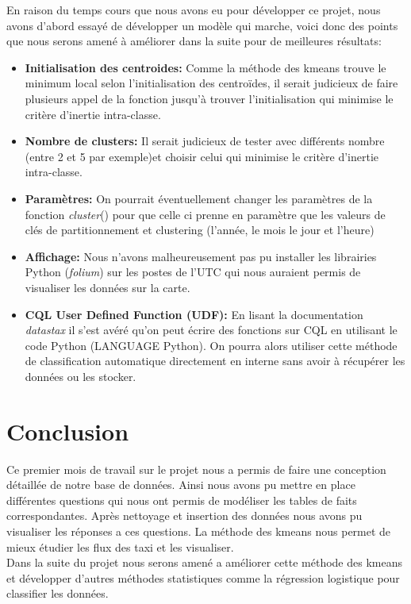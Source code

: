 \documentclass[]{report}
\begin{document}
	En raison du temps cours que  nous avons eu pour développer ce projet, nous avons d'abord essayé de développer un modèle qui marche, voici donc des points que nous  serons amené à  améliorer dans la suite pour de meilleures résultats:
	\begin{itemize}
		\item \textbf{Initialisation des centroides:} Comme la méthode des kmeans trouve le minimum local selon l'initialisation des centroïdes, il serait judicieux de faire plusieurs appel de la fonction jusqu'à trouver l'initialisation qui minimise le critère d'inertie intra-classe.
		\item \textbf{Nombre de clusters:}  Il serait judicieux de tester avec différents nombre (entre 2 et 5 par exemple)et choisir celui qui minimise le critère d'inertie intra-classe.
		\item \textbf{Paramètres:} On pourrait éventuellement changer les paramètres de la fonction \textit{cluster}() pour que celle ci prenne en paramètre que les valeurs de clés de partitionnement  et clustering (l'année, le mois le jour et l'heure)
		\item \textbf{Affichage:} Nous n'avons malheureusement pas pu installer les librairies Python (\textit{folium}) sur les postes de l'UTC qui nous auraient permis de visualiser les données sur la carte.
		\item \textbf{CQL User Defined Function (UDF):} En lisant la documentation \textit{datastax} il s'est avéré qu'on peut écrire des fonctions sur CQL en utilisant le code Python (LANGUAGE Python). On pourra alors utiliser cette méthode de classification automatique directement en interne sans avoir à récupérer les données ou les stocker.
	\end{itemize}
	
	\section{Conclusion}
	Ce premier mois de travail sur le projet nous a permis de faire une conception détaillée de notre base de données. Ainsi nous avons pu mettre en place différentes questions qui nous ont permis de modéliser les tables de faits correspondantes. Après nettoyage et insertion des données nous avons pu visualiser les réponses a ces questions. La méthode des kmeans nous permet de mieux étudier les flux des taxi et les visualiser.\\
	Dans la suite du projet nous serons amené a améliorer cette méthode des kmeans et développer d'autres méthodes statistiques comme la régression logistique pour classifier les données.
\end{document}
